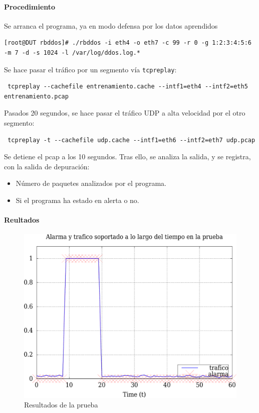 \paragraph{Procedimiento}
Se arranca el programa, ya en modo defensa por los datos aprendidos
\begin{verbatim}
[root@DUT rbddos]# ./rbddos -i eth4 -o eth7 -c 99 -r 0 -g 1:2:3:4:5:6  -m 7 -d -s 1024 -l /var/log/ddos.log.*
\end{verbatim}

Se hace pasar el tráfico por un segmento vía \texttt{tcpreplay}:
\begin{verbatim}
 tcpreplay --cachefile entrenamiento.cache --intf1=eth4 --intf2=eth5 entrenamiento.pcap
\end{verbatim}

Pasados 20 segundos, se hace pasar el tráfico UDP a alta velocidad por el otro segmento:
\begin{verbatim}
 tcpreplay -t --cachefile udp.cache --intf1=eth6 --intf2=eth7 udp.pcap
\end{verbatim}

Se detiene el pcap a los 10 segundos. Tras ello, se analiza la salida, y se registra, con la salida de depuración:
\begin{itemize}
 \item Número de paquetes analizados por el programa.
 \item Si el programa ha estado en alerta o no.
\end{itemize}

\paragraph{Reultados}

\begin{figure}[htbp]
\centering
\includegraphics[width=\textwidth]{CapituloPruebas/Figuras/pruebaTrafico-crop}
\caption{Resultados de la prueba}
\end{figure}
%

